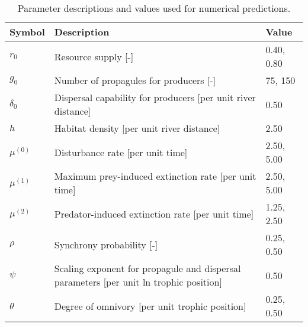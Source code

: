 \begin{table}[ht]
\centering
\caption{Parameter descriptions and values used for numerical predictions.} 
\label{tab:parms-num}
\begingroup\small
\begin{tabularx}{\textwidth}{lll}
  \hline
Symbol & Description & Value \\ 
  \hline
$r_0$ & Resource supply [-] & 0.40, 0.80 \\ 
  $g_0$ & Number of propagules for producers [-] & 75, 150 \\ 
  $\delta_0$ & Dispersal capability for producers [per unit river distance] & 0.50 \\ 
  $h$ & Habitat density [per unit river distance] & 2.50 \\ 
  $\mu^{(0)}$ & Disturbance rate [per unit time] & 2.50, 5.00 \\ 
  $\mu^{(1)}$ & Maximum prey-induced extinction rate [per unit time] & 2.50, 5.00 \\ 
  $\mu^{(2)}$ & Predator-induced extinction rate [per unit time] & 1.25, 2.50 \\ 
  $\rho$ & Synchrony probability [-] & 0.25, 0.50 \\ 
  $\psi$ & Scaling exponent for propagule and dispersal parameters [per unit ln trophic position] & 0.50 \\ 
  $\theta$ & Degree of omnivory [per unit trophic position] & 0.25, 0.50 \\ 
   \hline
\end{tabularx}
\endgroup
\end{table}
